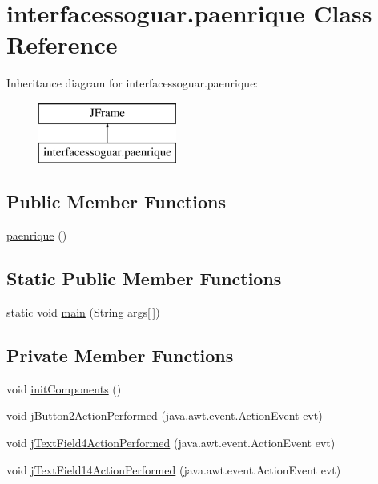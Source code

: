 \hypertarget{classinterfacessoguar_1_1paenrique}{}\section{interfacessoguar.\+paenrique Class Reference}
\label{classinterfacessoguar_1_1paenrique}
Inheritance diagram for interfacessoguar.\+paenrique\+:\begin{figure}[H]
\begin{center}
\leavevmode
\includegraphics[height=2.000000cm]{classinterfacessoguar_1_1paenrique}
\end{center}
\end{figure}
\subsection*{Public Member Functions}
\begin{DoxyCompactItemize}
\item 
\mbox{\hyperlink{classinterfacessoguar_1_1paenrique_aa7ddf4a74bfe7090389039f25ca3572a}{paenrique}} ()
\end{DoxyCompactItemize}
\subsection*{Static Public Member Functions}
\begin{DoxyCompactItemize}
\item 
static void \mbox{\hyperlink{classinterfacessoguar_1_1paenrique_a936bcab08619d05d934f116096744c06}{main}} (String args\mbox{[}$\,$\mbox{]})
\end{DoxyCompactItemize}
\subsection*{Private Member Functions}
\begin{DoxyCompactItemize}
\item 
void \mbox{\hyperlink{classinterfacessoguar_1_1paenrique_a2dd66331089bab9a01914d7f30207fea}{init\+Components}} ()
\item 
void \mbox{\hyperlink{classinterfacessoguar_1_1paenrique_a34ea7075cb88cd57a469832b7fa53e7f}{j\+Button2\+Action\+Performed}} (java.\+awt.\+event.\+Action\+Event evt)
\item 
void \mbox{\hyperlink{classinterfacessoguar_1_1paenrique_ac522a7702d9460bf287a10c52e146d21}{j\+Text\+Field4\+Action\+Performed}} (java.\+awt.\+event.\+Action\+Event evt)
\item 
void \mbox{\hyperlink{classinterfacessoguar_1_1paenrique_adbe22819e6df43b7a194f04c14a31a4d}{j\+Text\+Field14\+Action\+Performed}} (java.\+awt.\+event.\+Action\+Event evt)
\end{DoxyCompactItemize}
